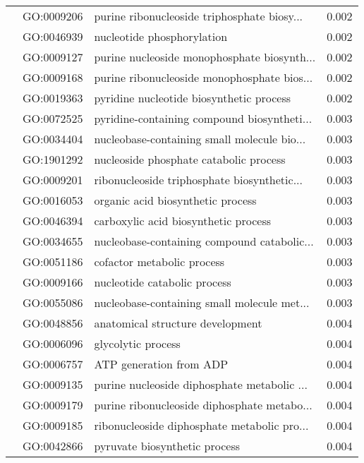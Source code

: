 \begin{longtable}{lllr}
   & GO:0009206 &  purine ribonucleoside triphosphate biosy... &         0.002 \\
   & GO:0046939 &                   nucleotide phosphorylation &         0.002 \\
   & GO:0009127 &  purine nucleoside monophosphate biosynth... &         0.002 \\
   & GO:0009168 &  purine ribonucleoside monophosphate bios... &         0.002 \\
   & GO:0019363 &     pyridine nucleotide biosynthetic process &         0.002 \\
   & GO:0072525 &  pyridine-containing compound biosyntheti... &         0.003 \\
   & GO:0034404 &  nucleobase-containing small molecule bio... &         0.003 \\
   & GO:1901292 &       nucleoside phosphate catabolic process &         0.003 \\
   & GO:0009201 &  ribonucleoside triphosphate biosynthetic... &         0.003 \\
   & GO:0016053 &            organic acid biosynthetic process &         0.003 \\
   & GO:0046394 &         carboxylic acid biosynthetic process &         0.003 \\
   & GO:0034655 &  nucleobase-containing compound catabolic... &         0.003 \\
   & GO:0051186 &                   cofactor metabolic process &         0.003 \\
   & GO:0009166 &                 nucleotide catabolic process &         0.003 \\
   & GO:0055086 &  nucleobase-containing small molecule met... &         0.003 \\
   & GO:0048856 &             anatomical structure development &         0.004 \\
   & GO:0006096 &                           glycolytic process &         0.004 \\
   & GO:0006757 &                      ATP generation from ADP &         0.004 \\
   & GO:0009135 &  purine nucleoside diphosphate metabolic ... &         0.004 \\
   & GO:0009179 &  purine ribonucleoside diphosphate metabo... &         0.004 \\
   & GO:0009185 &  ribonucleoside diphosphate metabolic pro... &         0.004 \\
   & GO:0042866 &                pyruvate biosynthetic process &         0.004 \\

\end{longtable}

